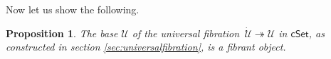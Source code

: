\documentclass[12pt]{article}
\makeatletter
\newcommand{\cSet}{\ensuremath{\mathsf{cSet}}}
\newcommand{\fib}{\ensuremath{\twoheadrightarrow}}
\renewcommand{\to}{\ensuremath{\rightarrow}}
\newcommand{\I}{\ensuremath{\mathrm{I}}}
\newcommand{\U}{\ensuremath{\mathcal{U}}}
\newcommand{\UU}{\ensuremath{\,\dot{\mathcal{U}}}}
\newcommand{\V}{\ensuremath{\mathcal{V}}}
\newcommand{\VV}{\ensuremath{\dot{\mathcal{V}}}}
\newcommand{\Fib}{\ensuremath{\mathsf{Fib}}}
\newtheorem{proposition}[theorem]{Proposition}
\theoremstyle{remark}
\theoremstyle{definition}
\newcommand{\pbcorner}[1][dr]{\save*!/#1-1.2pc/#1:(-1,1)@^{|-}\restore}
\makeatother
\begin{document}
%

Now let us show the following.
\begin{proposition}
The base $\U$ of the universal fibration $\UU\fib\U$ in $\cSet$, as constructed in section \ref{sec:universalfibration}, is a fibrant object.
\end{proposition}
\end{document}
